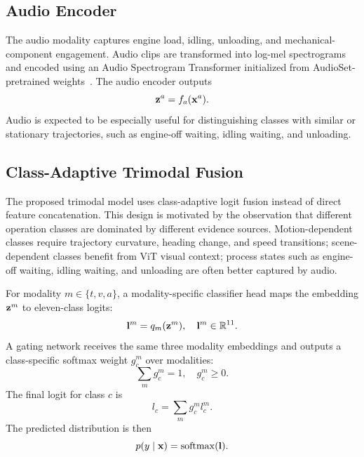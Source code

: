 \subsection{Audio Encoder}

The audio modality captures engine load, idling, unloading, and mechanical-component engagement. Audio clips are transformed into log-mel spectrograms and encoded using an Audio Spectrogram Transformer initialized from AudioSet-pretrained weights~\cite{gong2021ast}. The audio encoder outputs
\begin{equation}
    \mathbf{z}^{a} = f_a(\mathbf{x}^{a}).
\end{equation}
Audio is expected to be especially useful for distinguishing classes with similar or stationary trajectories, such as engine-off waiting, idling waiting, and unloading.

\subsection{Class-Adaptive Trimodal Fusion}
\label{sec:class_gate}

The proposed trimodal model uses class-adaptive logit fusion instead of direct feature concatenation. This design is motivated by the observation that different operation classes are dominated by different evidence sources. Motion-dependent classes require trajectory curvature, heading change, and speed transitions; scene-dependent classes benefit from ViT visual context; process states such as engine-off waiting, idling waiting, and unloading are often better captured by audio.

For modality $m \in \{t,v,a\}$, a modality-specific classifier head maps the embedding $\mathbf{z}^m$ to eleven-class logits:
\begin{equation}
    \mathbf{l}^{m} = q_m(\mathbf{z}^m), \quad \mathbf{l}^{m} \in \mathbb{R}^{11}.
\end{equation}
A gating network receives the same three modality embeddings and outputs a class-specific softmax weight $g_{c}^{m}$ over modalities:
\begin{equation}
    \sum_m g_{c}^{m}=1, \quad g_{c}^{m} \geq 0 .
\end{equation}
The final logit for class $c$ is
\begin{equation}
    l_c = \sum_m g_{c}^{m} l_c^{m}.
\end{equation}
The predicted distribution is then
\begin{equation}
    p(y \mid \mathbf{x}) = \operatorname{softmax}(\mathbf{l}).
\end{equation}

